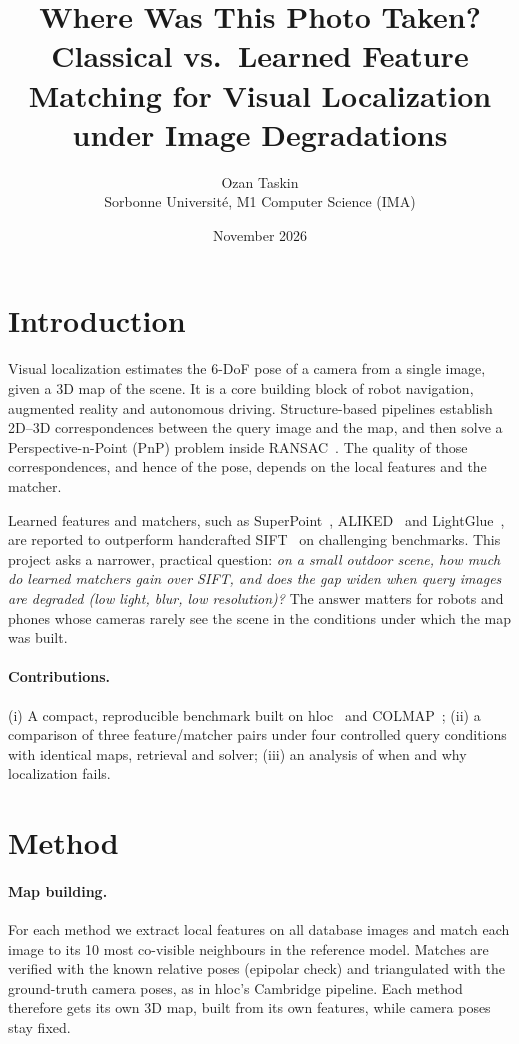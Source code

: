 \documentclass[11pt,a4paper]{article}
\title{Where Was This Photo Taken?\\[2pt]
\large Classical vs.\ Learned Feature Matching for Visual Localization under Image Degradations}
\author{Ozan Taskin\\\small Sorbonne Université, M1 Computer Science (IMA)}
\date{November 2026}
\begin{document}
\maketitle

\begin{abstract}
\end{abstract}

\section{Introduction}
Visual localization estimates the 6-DoF pose of a camera from a single image, given a
3D map of the scene. It is a core building block of robot navigation, augmented reality
and autonomous driving. Structure-based pipelines establish 2D--3D correspondences between
the query image and the map, and then solve a Perspective-n-Point (PnP) problem inside
RANSAC~\cite{sarlin2019coarse}. The quality of those correspondences, and hence of the pose,
depends on the local features and the matcher.

Learned features and matchers, such as SuperPoint~\cite{detone2018superpoint},
ALIKED~\cite{zhao2023aliked} and LightGlue~\cite{lindenberger2023lightglue}, are reported to
outperform handcrafted SIFT~\cite{lowe2004sift} on challenging benchmarks. This project asks a
narrower, practical question: \emph{on a small outdoor scene, how much do learned matchers gain
over SIFT, and does the gap widen when query images are degraded (low light, blur, low
resolution)?} The answer matters for robots and phones whose cameras rarely see the scene in
the conditions under which the map was built.

\paragraph{Contributions.}
(i) A compact, reproducible benchmark built on hloc~\cite{sarlin2019coarse} and
COLMAP~\cite{schoenberger2016sfm}; (ii) a comparison of three feature/matcher pairs under four
controlled query conditions with identical maps, retrieval and solver; (iii) an analysis of
when and why localization fails.

\section{Method}
\paragraph{Map building.}
For each method we extract local features on all database images and match each image to
its 10 most co-visible neighbours in the reference model. Matches are verified with the
known relative poses (epipolar check) and triangulated with the ground-truth camera poses,
as in hloc's Cambridge pipeline. Each method therefore gets its own 3D map, built from its
own features, while camera poses stay fixed.
\end{document}
